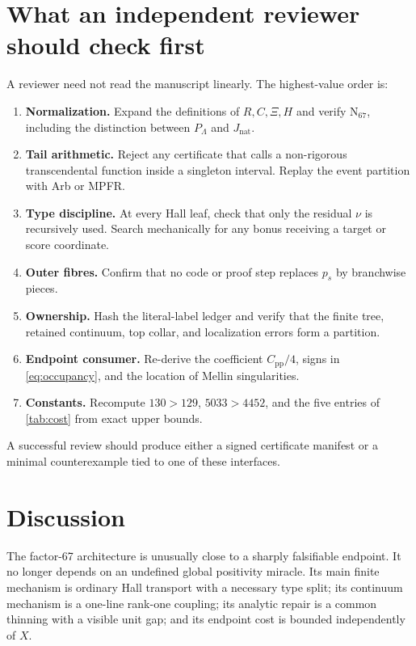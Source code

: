 \documentclass[11pt]{article}
\theoremstyle{definition}
\theoremstyle{remark}
\newcommand{\1}{\mathbf 1}
\newcommand{\Nat}{\mathrm{nat}}
\begin{document}
\section{What an independent reviewer should check first}\label{sec:review}

A reviewer need not read the manuscript linearly.  The highest-value order is:

\begin{enumerate}
\item \textbf{Normalization.}  Expand the definitions of \(R,C,\Xi,H\) and verify \(\mathrm N_{67}\), including the distinction between \(P_\Lambda\) and \(J_{\Nat}\).
\item \textbf{Tail arithmetic.}  Reject any certificate that calls a non-rigorous transcendental function inside a singleton interval.  Replay the event partition with Arb or MPFR.
\item \textbf{Type discipline.}  At every Hall leaf, check that only the residual \(\nu\) is recursively used.  Search mechanically for any bonus receiving a target or score coordinate.
\item \textbf{Outer fibres.}  Confirm that no code or proof step replaces \(p_s\) by branchwise pieces.
\item \textbf{Ownership.}  Hash the literal-label ledger and verify that the finite tree, retained continuum, top collar, and localization errors form a partition.
\item \textbf{Endpoint consumer.}  Re-derive the coefficient \(C_{\mathrm{pp}}/4\), signs in \eqref{eq:occupancy}, and the location of Mellin singularities.
\item \textbf{Constants.}  Recompute \(130>129\), \(5033>4452\), and the five entries of \cref{tab:cost} from exact upper bounds.
\end{enumerate}

A successful review should produce either a signed certificate manifest or a minimal counterexample tied to one of these interfaces.

\section{Discussion}

The factor-67 architecture is unusually close to a sharply falsifiable endpoint.  It no longer depends on an undefined global positivity miracle.  Its main finite mechanism is ordinary Hall transport with a necessary type split; its continuum mechanism is a one-line rank-one coupling; its analytic repair is a common thinning with a visible unit gap; and its endpoint cost is bounded independently of \(X\).
\end{document}
